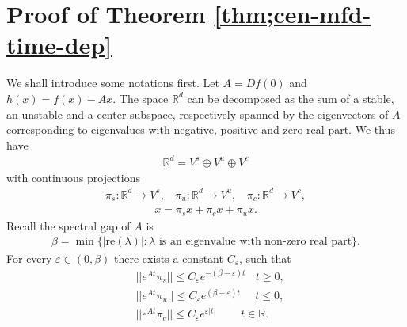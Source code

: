 \documentclass[11pt]{amsart}
\theoremstyle{definition}
\theoremstyle{remark}
\numberwithin{equation}{section}
\newcommand{\ep}{\varepsilon}
\begin{document}
\section{Proof of Theorem \ref{thm;cen-mfd-time-dep}} \label{sec:appendix}
We shall introduce some notations first. Let $A=Df(0)$ and $h(x)=f(x)-Ax$. The space $\mathbb{R}^d$ can be decomposed as the sum of a stable, an unstable and a center subspace, respectively spanned by the eigenvectors of $A$ corresponding to eigenvalues with negative, positive and zero real part. We thus have 
\begin{align*}
    \mathbb{R}^d=V^{s}\oplus V^u\oplus V^c
\end{align*}
with continuous projections
\begin{align*}
    \pi_s:\mathbb{R}^d\rightarrow V^s,\ \ \ \ \pi_u:\mathbb{R}^d\rightarrow V^u,\ \ \ \ \pi_c:\mathbb{R}^d\rightarrow V^c,
\end{align*}
\begin{align*}
    x=\pi_s x+\pi_c x+\pi_u x.
\end{align*}    
Recall the spectral gap of $A$ is
\begin{align*}
    \beta =\min\{|\text{re}(\lambda)|:\lambda \text{ is\ an \ eigenvalue\ with\ non-zero\ real\ part} \}. 
\end{align*}
For every $\ep\in(0,\beta)$ there exists a constant $C_\ep$,  such that
\begin{equation}
\label{eq;est-decom}
    \begin{aligned}
    &||e^{At}\pi_s||\le C_\ep e^{-(\beta-\ep)t}\ \ \ \ t\ge 0,\\
    &||e^{At}\pi_u||\le C_\ep e^{(\beta-\ep)t}\ \ \ \ \ \ t\le 0,\\
    &||e^{At}\pi_c||\le C_\ep e^{\ep |t|}\ \ \ \ \ \ \ \ \ \ t\in\mathbb{R}.
\end{aligned}
\end{equation}
\end{document}
